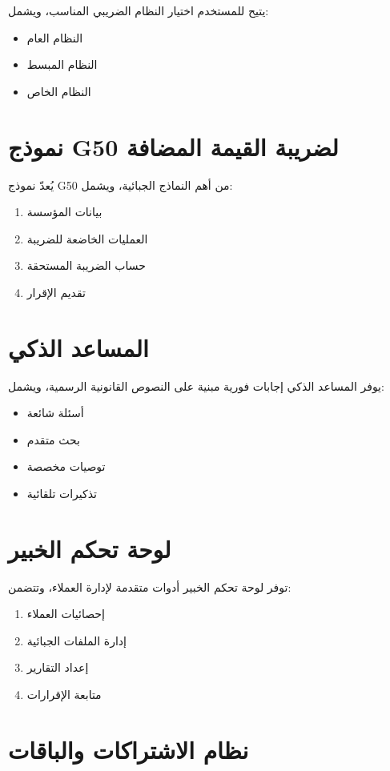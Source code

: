 \documentclass[12pt, a4paper, twoside]{report}
\begin{document}
يتيح للمستخدم اختيار النظام الضريبي المناسب، ويشمل:
\begin{itemize}
    \item النظام العام
    \item النظام المبسط
    \item النظام الخاص
\end{itemize}

\section{نموذج G50 لضريبة القيمة المضافة}

يُعدّ نموذج G50 من أهم النماذج الجبائية، ويشمل:
\begin{enumerate}
    \item بيانات المؤسسة
    \item العمليات الخاضعة للضريبة
    \item حساب الضريبة المستحقة
    \item تقديم الإقرار
\end{enumerate}

\section{المساعد الذكي}

يوفر المساعد الذكي إجابات فورية مبنية على النصوص القانونية الرسمية، ويشمل:
\begin{itemize}
    \item أسئلة شائعة
    \item بحث متقدم
    \item توصيات مخصصة
    \item تذكيرات تلقائية
\end{itemize}

\section{لوحة تحكم الخبير}

توفر لوحة تحكم الخبير أدوات متقدمة لإدارة العملاء، وتتضمن:
\begin{enumerate}
    \item إحصائيات العملاء
    \item إدارة الملفات الجبائية
    \item إعداد التقارير
    \item متابعة الإقرارات
\end{enumerate}

\section{نظام الاشتراكات والباقات}
\end{document}
